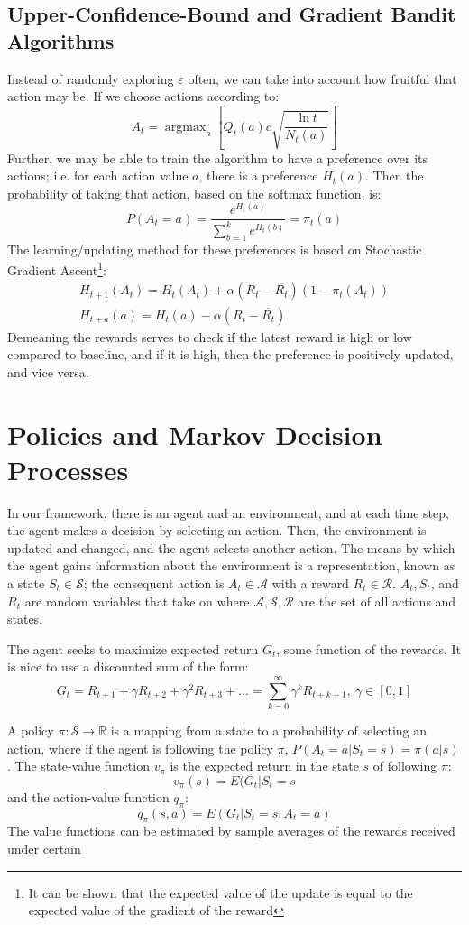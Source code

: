 \documentclass[12pt, reqno]{article}
\theoremstyle{plain}    \newtheorem{theorem}{Theorem}[section]
\theoremstyle{plain}    \newtheorem{lemma}[theorem]{Lemma}
\theoremstyle{plain}    \newtheorem{claim}[theorem]{Claim}
\theoremstyle{plain}    \newtheorem{definition}{Definition}[section]
\theoremstyle{plain}    \newtheorem{proposition}[theorem]{Proposition}
\theoremstyle{plain}    \newtheorem{corollary}[theorem]{Corollary}
\theoremstyle{plain}    \newtheorem{example}[definition]{Example}
\DeclareMathOperator*{\argmax}{argmax}
\newcommand{\RR}{\mathbb R}
\newcommand{\eps}{\varepsilon}
\numberwithin{equation}{section}
\begin{document}
\subsection{Upper-Confidence-Bound and Gradient Bandit Algorithms}
Instead of randomly exploring \(\eps\) often, we can take into account how
fruitful that action may be. If we choose actions according to:
\[A_t = \argmax_a \left[Q_t(a) c \sqrt{\frac{\ln t}{N_t(a)}}\right]\]
Further, we may be able to train the algorithm to have a preference over its
actions; i.e. for each action value \(a\), there is a preference \(H_t(a)\).
Then the probability of taking that action, based on the softmax
function, is:
\[P(A_t = a) = \frac{e^{H_t(a)}}{\sum_{b=1}^{k}e^{H_t(b)}} = \pi_t(a)\]
The learning/updating method for these preferences is based on Stochastic
Gradient Ascent\footnote{It can be shown that the expected value of the update
is equal to the expected value of the gradient of the reward}:
\begin{gather*}
	H_{t+1}(A_t) = H_t(A_t) + \alpha(R_t - \overline{R_t})(1 - \pi_t(A_t))\\
	H_{t+a}(a) = H_t(a) - \alpha(R_t - \overline{R_t}) 
\end{gather*}
Demeaning the rewards serves to check if the latest reward is high or low
compared to baseline, and if it is high, then the preference is positively
updated, and vice versa. 

\section{Policies and Markov Decision Processes}
In our framework, there is an agent and an environment, and at each time step,
the agent makes a decision by selecting an action. Then, the environment is
updated and changed, and the agent selects another action. The means by which
the agent gains information about the environment is a representation, known as
a state \(S_t \in \mathcal{S}\); the consequent action is \(A_t \in
\mathcal{A}\) with a reward \(R_t \in \mathcal{R}\). \(A_t, S_t\), and \(R_t\)
are random variables that take on  where \(\mathcal{A},
\mathcal{S}, \mathcal{R}\) are the set of all actions and
states. 

The agent seeks to maximize expected return \(G_t\), some function of the
rewards. It is nice to use a discounted sum of the form:
\[G_t = R_{t+1} + \gamma R_{t+2} + \gamma^2 R_{t+3} + \dots =
\sum_{k=0}^{\infty}\gamma^k R_{t+k+1}, \ \gamma \in [0,1]\]

A policy \(\pi: \mathcal{S} \to \RR\) is a mapping from a state to a
probability of selecting an action, where if the agent is following the policy
\(\pi\), \(P(A_t = a | S_t = s) = \pi(a|s)\). The state-value function \(v_{\pi}\) is
the expected return in the state \(s\) of following \(\pi\): 
\[v_{\pi}(s) = E(G_t | S_t = s\]
and the action-value function \(q_{\pi}\):
\[q_{\pi}(s,a) = E(G_t | S_t = s, A_t = a)\]
The value functions can be estimated by sample averages of the rewards received
under certain 
\end{document}
